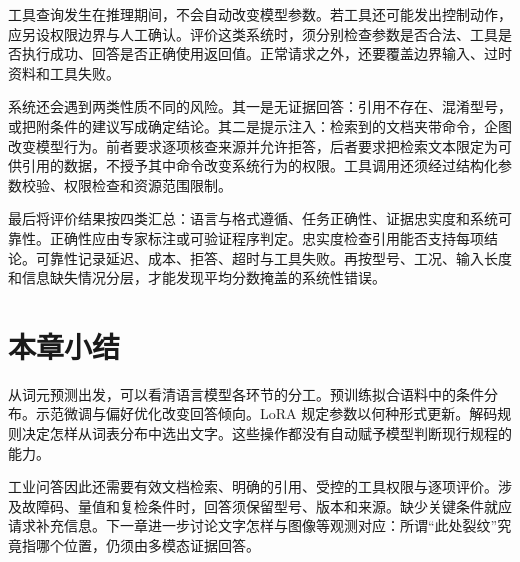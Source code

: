 工具查询发生在推理期间，不会自动改变模型参数。若工具还可能发出控制动作，应另设权限边界与人工确认。评价这类系统时，须分别检查参数是否合法、工具是否执行成功、回答是否正确使用返回值。正常请求之外，还要覆盖边界输入、过时资料和工具失败。

系统还会遇到两类性质不同的风险。其一是无证据回答：引用不存在、混淆型号，或把附条件的建议写成确定结论。其二是提示注入：检索到的文档夹带命令，企图改变模型行为。前者要求逐项核查来源并允许拒答，后者要求把检索文本限定为可供引用的数据，不授予其中命令改变系统行为的权限。工具调用还须经过结构化参数校验、权限检查和资源范围限制。

最后将评价结果按四类汇总：语言与格式遵循、任务正确性、证据忠实度和系统可靠性。正确性应由专家标注或可验证程序判定。忠实度检查引用能否支持每项结论。可靠性记录延迟、成本、拒答、超时与工具失败。再按型号、工况、输入长度和信息缺失情况分层，才能发现平均分数掩盖的系统性错误。

\section*{本章小结}
从词元预测出发，可以看清语言模型各环节的分工。预训练拟合语料中的条件分布。示范微调与偏好优化改变回答倾向。LoRA 规定参数以何种形式更新。解码规则决定怎样从词表分布中选出文字。这些操作都没有自动赋予模型判断现行规程的能力。

工业问答因此还需要有效文档检索、明确的引用、受控的工具权限与逐项评价。涉及故障码、量值和复检条件时，回答须保留型号、版本和来源。缺少关键条件就应请求补充信息。下一章进一步讨论文字怎样与图像等观测对应：所谓“此处裂纹”究竟指哪个位置，仍须由多模态证据回答。

